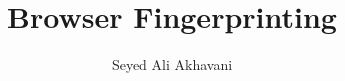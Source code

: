 \documentclass[sigconf, anonymous]{acmart}
\begin{document}
\title{Browser Fingerprinting}

\author[1]{Seyed Ali Akhavani}



\maketitle

% 


% 





\end{document}
